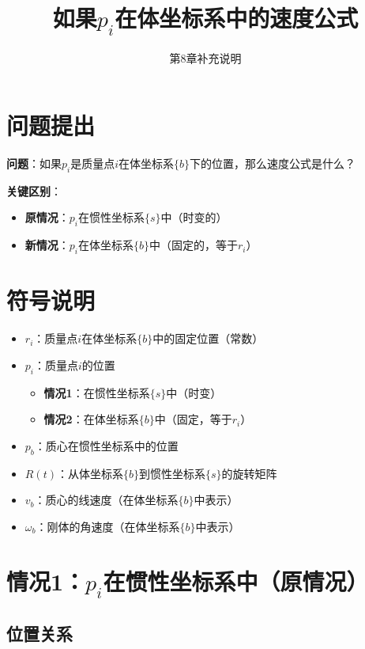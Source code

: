\documentclass[12pt,a4paper]{article}
\title{如果$p_i$在体坐标系中的速度公式}
\author{第8章补充说明}
\date{}
\begin{document}
\maketitle

\section{问题提出}

\textbf{问题}：如果$p_i$是质量点$i$在体坐标系$\{b\}$下的位置，那么速度公式是什么？

\textbf{关键区别}：
\begin{itemize}
\item \textbf{原情况}：$p_i$在惯性坐标系$\{s\}$中（时变的）
\item \textbf{新情况}：$p_i$在体坐标系$\{b\}$中（固定的，等于$r_i$）
\end{itemize}

\section{符号说明}

\begin{itemize}
\item $r_i$：质量点$i$在体坐标系$\{b\}$中的固定位置（常数）
\item $p_i$：质量点$i$的位置
  \begin{itemize}
  \item \textbf{情况1}：在惯性坐标系$\{s\}$中（时变）
  \item \textbf{情况2}：在体坐标系$\{b\}$中（固定，等于$r_i$）
  \end{itemize}
\item $p_b$：质心在惯性坐标系中的位置
\item $R(t)$：从体坐标系$\{b\}$到惯性坐标系$\{s\}$的旋转矩阵
\item $v_b$：质心的线速度（在体坐标系$\{b\}$中表示）
\item $\omega_b$：刚体的角速度（在体坐标系$\{b\}$中表示）
\end{itemize}

\section{情况1：$p_i$在惯性坐标系中（原情况）}

\subsection{位置关系}
\end{document}
